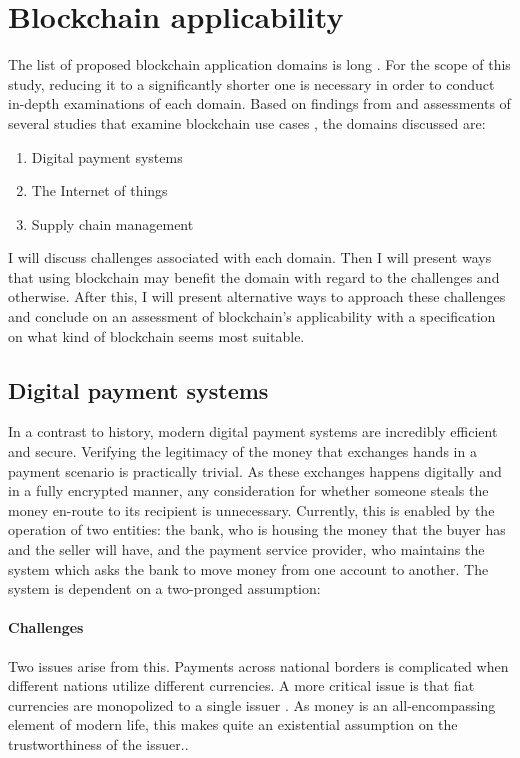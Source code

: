 \section{Blockchain applicability} \label{applications}

The list of proposed blockchain application domains is long
\cite{zileUseCases}. For the scope of this study, reducing it to a
significantly shorter one is necessary in order to conduct in-depth
examinations of each domain. Based on findings from \cite{jaoudeApplications} 
and assessments of several studies that examine blockchain use cases
\cite{sankaScalability,wustBlockchainNeed,zhengChallenges}, the
domains discussed are:

\begin{enumerate}
  \item Digital payment systems
  \item The Internet of things
  \item Supply chain management
\end{enumerate}

I will discuss challenges associated with each domain. Then I will present
ways that using blockchain may benefit the domain with regard to the
challenges and otherwise. After this, I will present alternative ways
to approach these challenges and conclude on an assessment of blockchain's
applicability with a specification on what kind of blockchain seems most
suitable.

\subsection{Digital payment systems}

In a contrast to history, modern digital payment systems are incredibly
efficient and secure. Verifying the legitimacy of the money that exchanges
hands in a payment scenario is practically trivial. As these exchanges
happens digitally and in a fully encrypted manner, any consideration for
whether someone steals the money en-route to its recipient is unnecessary.
Currently, this is enabled by the operation of two entities: the bank, who
is housing the money that the buyer has and the seller will have, and
the payment service provider, who maintains the system which asks the bank
to move money from one account to another. The system is dependent on a
two-pronged assumption:

\paragraph{Challenges} Two  issues arise from this. Payments
across national borders is complicated when different nations utilize
different currencies. A more critical issue is that fiat currencies
are monopolized to a single issuer \cite{eichengreenCommodity}. As
money is an all-encompassing element of modern life, this makes quite
an existential assumption on the trustworthiness of the issuer.. 

